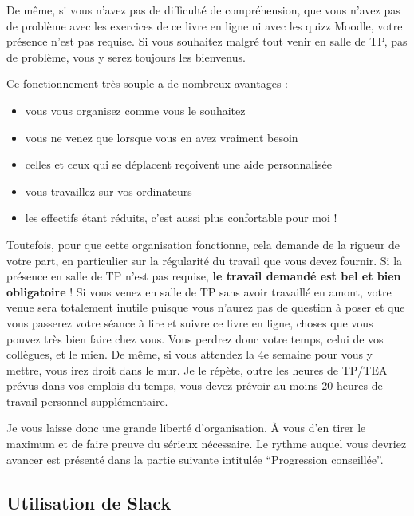 \documentclass[
  a4paper,
  DIV=11,
  numbers=noendperiod,
  oneside]{scrreprt}
\providecommand{\tightlist}{%
  \setlength{\itemsep}{0pt}\setlength{\parskip}{0pt}}\usepackage{longtable,booktabs,array}
\begin{document}
De même, si vous n'avez pas de difficulté de compréhension, que vous
n'avez pas de problème avec les exercices de ce livre en ligne ni avec
les quizz Moodle, votre présence n'est pas requise. Si vous souhaitez
malgré tout venir en salle de TP, pas de problème, vous y serez toujours
les bienvenus.

Ce fonctionnement très souple a de nombreux avantages :

\begin{itemize}
\tightlist
\item
  vous vous organisez comme vous le souhaitez
\item
  vous ne venez que lorsque vous en avez vraiment besoin
\item
  celles et ceux qui se déplacent reçoivent une aide personnalisée
\item
  vous travaillez sur vos ordinateurs
\item
  les effectifs étant réduits, c'est aussi plus confortable pour moi !
\end{itemize}

Toutefois, pour que cette organisation fonctionne, cela demande de la
rigueur de votre part, en particulier sur la régularité du travail que
vous devez fournir. Si la présence en salle de TP n'est pas requise,
\textbf{le travail demandé est bel et bien obligatoire} ! Si vous venez
en salle de TP sans avoir travaillé en amont, votre venue sera
totalement inutile puisque vous n'aurez pas de question à poser et que
vous passerez votre séance à lire et suivre ce livre en ligne, choses
que vous pouvez très bien faire chez vous. Vous perdrez donc votre
temps, celui de vos collègues, et le mien. De même, si vous attendez la
4e semaine pour vous y mettre, vous irez droit dans le mur. Je le
répète, outre les heures de TP/TEA prévus dans vos emplois du temps,
vous devez prévoir au moins 20 heures de travail personnel
supplémentaire.

Je vous laisse donc une grande liberté d'organisation. À vous d'en tirer
le maximum et de faire preuve du sérieux nécessaire. Le rythme auquel
vous devriez avancer est présenté dans la partie suivante intitulée
``Progression conseillée''.

\hypertarget{utilisation-de-slack}{%
\subsection*{Utilisation de Slack}\label{utilisation-de-slack}}
\end{document}
